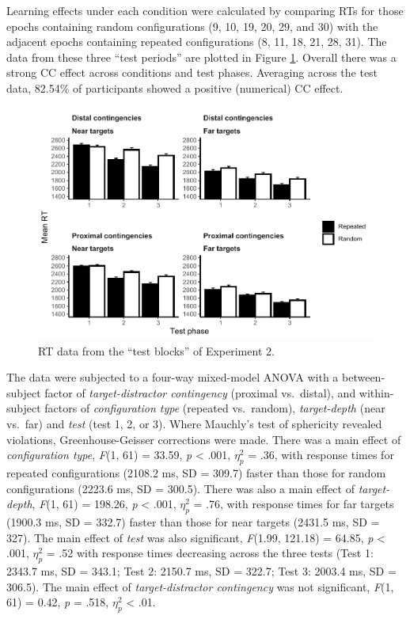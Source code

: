 \documentclass[
  english,
  man,floatsintext]{apa7}
\begin{document}
Learning effects under each condition were calculated by comparing RTs for those epochs containing random configurations (9, 10, 19, 20, 29, and 30) with the adjacent epochs containing repeated configurations (8, 11, 18, 21, 28, 31). The data from these three ``test periods'' are plotted in Figure \ref{fig:Exp2-test-figure}. Overall there was a strong CC effect across conditions and test phases. Averaging across the test data, 82.54\% of participants showed a positive (numerical) CC effect.



\begin{figure}

{\centering \includegraphics[width=1\linewidth]{CCVR_manuscript_files/figure-latex/Exp2-test-figure-1} 

}

\caption{RT data from the ``test blocks'' of Experiment 2.}\label{fig:Exp2-test-figure}
\end{figure}

The data were subjected to a four-way mixed-model ANOVA with a between-subject factor of \emph{target-distractor contingency} (proximal vs.~distal), and within-subject factors of \emph{configuration type} (repeated vs.~random), \emph{target-depth} (near vs.~far) and \emph{test} (test 1, 2, or 3). Where Mauchly's test of sphericity revealed violations, Greenhouse-Geisser corrections were made. There was a main effect of \emph{configuration type}, \emph{F}(1, 61) = 33.59, \emph{p} \textless{} .001, \(\eta^2_p\) = .36, with response times for repeated configurations (2108.2 ms, SD = 309.7) faster than those for random configurations (2223.6 ms, SD = 300.5). There was also a main effect of \emph{target-depth}, \emph{F}(1, 61) = 198.26, \emph{p} \textless{} .001, \(\eta^2_p\) = .76, with response times for far targets (1900.3 ms, SD = 332.7) faster than those for near targets (2431.5 ms, SD = 327). The main effect of \emph{test} was also significant, \emph{F}(1.99, 121.18) = 64.85, \emph{p} \textless{} .001, \(\eta^2_p\) = .52 with response times decreasing across the three tests (Test 1: 2343.7 ms, SD = 343.1; Test 2: 2150.7 ms, SD = 322.7; Test 3: 2003.4 ms, SD = 306.5). The main effect of \emph{target-distractor contingency} was not significant, \emph{F}(1, 61) = 0.42, \emph{p} = .518, \(\eta^2_p\) \textless{} .01.
\end{document}
